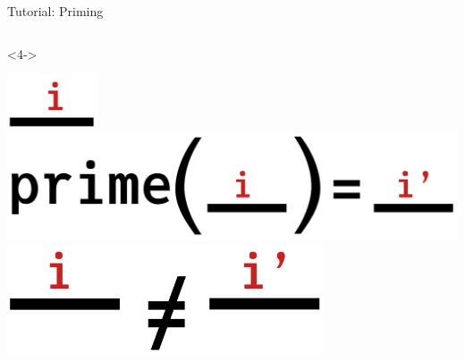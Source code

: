 \begin{frame}[fragile]{Tutorial: Priming}
\begin{columns}
\begin{column}{4.5cm}
\begin{onlyenv}<4->
~\\
\begin{center}
\includegraphics[width=0.2\textwidth]{
  slides/assets/i.png
} \\
\vspace*{0.5cm}
\includegraphics[width=1.0\textwidth]{
  slides/assets/prime_i.png
} \\
\includegraphics[width=0.7\textwidth]{
  slides/assets/i_neq_ip.png
}
\end{center}
\end{onlyenv}

\end{column}

\end{columns}

\end{frame}
